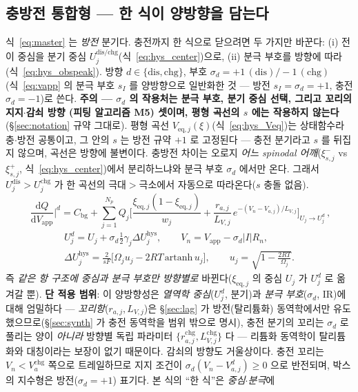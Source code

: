 \documentclass[11pt,a4paper]{article}
\newcommand{\dd}{\mathrm{d}}
\newcommand{\eq}{\mathrm{eq}}
\newcommand{\app}{\mathrm{app}}
\newcommand{\bg}{\mathrm{bg}}
\newcommand{\dis}{\mathrm{dis}}
\newcommand{\chg}{\mathrm{chg}}
\newcommand{\hys}{\mathrm{hys}}
\begin{document}
\subsection{충방전 통합형 — 한 식이 양방향을 담는다}
식~\eqref{eq:master} 는 \emph{방전} 분기다. 충전까지 한 식으로 닫으려면 두 가지만 바꾼다: (i) 전이 중심을 분기 중심
$U_j^{\dis/\chg}$(식~\eqref{eq:hys_center})으로, (ii) 분극 부호를 방향에 따라(식~\eqref{eq:hys_obspeak}). 방향
$d\in\{\dis,\chg\}$, 부호 $\sigma_d=+1\,(\dis)/-1\,(\chg)$ (식~\eqref{eq:vapp} 의 분극 부호 $s_I$ 를 양방향으로
일반화한 것 — 방전 $s_I=\sigma_d=+1$, 충전 $\sigma_d=-1$)로 쓴다. \textbf{주의 — $\sigma_d$ 의 작용처는 분극 부호, 분기 중심 선택, 그리고 꼬리의 지지$\cdot$감쇠 방향
(피팅 알고리즘 M5) 셋이며, 평형 곡선의 $s$ 에는 작용하지 않는다}(\S\ref{sec:notation} 규약 그대로). 평형 곡선 $V_{\eq,j}(\xi)$(식~\eqref{eq:hys_Veq})는 상태함수라
충$\cdot$방전 공통이고, 그 안의 $s$ 는 방전 규약 $+1$ 로 고정된다 — 충전 분기라고 $s$ 를 뒤집지 않으며, 곡선은
방향에 불변이다. 충방전 차이는 오로지 \emph{어느
spinodal 어깨}($\xi_{s,j}^-$ vs $\xi_{s,j}^+$, 식~\eqref{eq:hys_center})에서 분리하느냐와 분극 부호 $\sigma_d$ 에서만
온다. 그래서 $U_j^\dis>U_j^\chg$ 가 한 곡선의 극대$>$극소에서 자동으로 따라온다($s$ 충돌 없음).
\begin{equation}
\boxed{\;\frac{\dd Q}{\dd V_\app}\Big|^{d}=C_\bg+\sum_{j=1}^{N_p}Q_j\bigg[\frac{\xi_{\eq,j}(1-\xi_{\eq,j})}{w_j}
+\frac{r_{a,j}}{L_{V,j}}\,e^{-(V_n-V_{a,j})/L_{V,j}}\bigg]_{U_j\to U_j^{d}}\,,}
\label{eq:hys_master}
\end{equation}
\begin{gather*}
U_j^{d}=U_j+\sigma_d\tfrac12\gamma_j\Delta U_j^\hys,\qquad V_n=V_\app-\sigma_d|I|R_n,\\
\Delta U_j^\hys=\tfrac{2}{sF}\big[\Omega_j u_j-2RT\,\mathrm{artanh}\,u_j\big],\qquad u_j=\sqrt{1-\tfrac{2RT}{\Omega_j}}.
\end{gather*}
즉 \emph{같은 항 구조에 중심과 분극 부호만 방향별로} 바뀐다($\xi_{\eq,j}$ 의 중심 $U_j$ 가 $U_j^d$ 로 옮겨갈 뿐).
\textbf{단 적용 범위}: 이 양방향성은 \emph{열역학 중심}($U_j^d$, 분기)과 \emph{분극 부호}($\sigma_d$, IR)에 대해 엄밀하다 —
\emph{꼬리항}($r_{a,j},L_{V,j}$)은 \S\ref{sec:lag} 가 방전(탈리튬화) 동역학에서만 유도했으므로(\S\ref{sec:synth} 가 충전
동역학을 범위 밖으로 명시), 충전 분기의 꼬리는 $\sigma_d$ 로 풀리는 양이 \emph{아니라} 방향별 독립 파라미터
$\{r_{a,j}^\chg,L_{V,j}^\chg\}$ 다 — 리튬화 동역학이 탈리튬화와 대칭이라는 보장이 없기 때문이다. 감쇠의
방향도 거울상이다. 충전 꼬리는 $V_n<V_{a}^{\chg}$ 쪽으로 트레일하므로 지지 조건이
$\sigma_d(V_n-V_{a,j}^{d})\ge0$ 으로 반전되며, 박스의 지수형은 방전($\sigma_d=+1$) 표기다. 본 식의 ``한 식''은 \emph{중심$\cdot$분극}에
\end{document}
